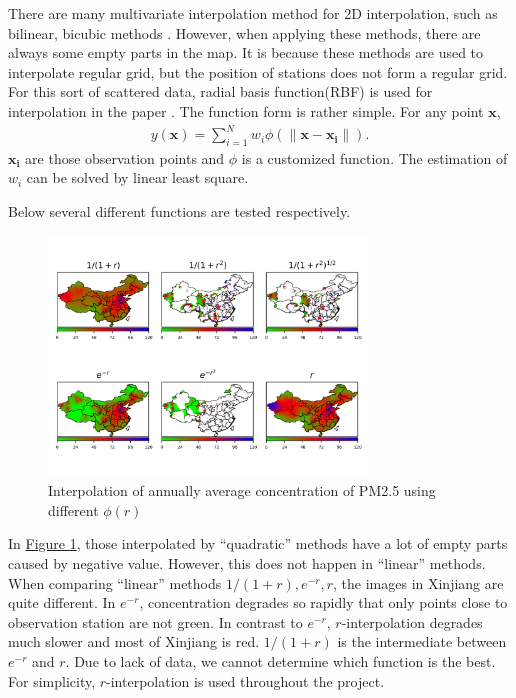 \documentclass[letterpaper]{article}
\begin{document}
\begin{CJK*}{UTF8}{gkai}
There are many multivariate interpolation method for 2D interpolation, such as bilinear, bicubic methods . However, when applying these methods, there are always some empty parts in the map. It is because these methods are used to interpolate regular grid, but the position of stations does not form a regular grid. For this sort of scattered data, radial basis function(RBF) is used for interpolation in the paper . The function form is rather simple. For any point $\mathbf{x}$,
\begin{eqnarray}
  y(\mathbf{x}) = \sum_{i=1}^Nw_i\phi\left(\|\mathbf{x} - \mathbf{x_i}\|\right).
\end{eqnarray}
$\mathbf{x_i}$ are those observation points and $\phi$ is a customized function. The estimation of $w_i$ can be solved by linear least square.

Below several different functions are tested respectively.

\begin{figure}[h]
  \includegraphics[width = 8.5cm]{Interpolation_from_20150102_to_20151231.png}
  \caption{Interpolation of annually average concentration of PM2.5 using different
    $\phi(r)$}
  \label{figure:0}
  \centering
\end{figure}

In \hyperref[figure:0]{Figure \ref*{figure:0}}, those interpolated by ``quadratic'' methods have a lot of empty parts caused by negative value. However, this does not happen in ``linear'' methods. When comparing ``linear'' methods $1/(1+r), e^{-r}, r$, the images in Xinjiang are quite different. In $e^{-r}$, concentration degrades so rapidly that only points close to observation station are not green. In contrast to $e^{-r}$, $r$-interpolation degrades much slower and most of Xinjiang is red. $1/(1+r)$ is the intermediate between $e^{-r}$ and $r$. Due to lack of data, we cannot determine which function is the best. For simplicity, $r$-interpolation is used throughout the project.


\end{CJK*}
\end{document}
